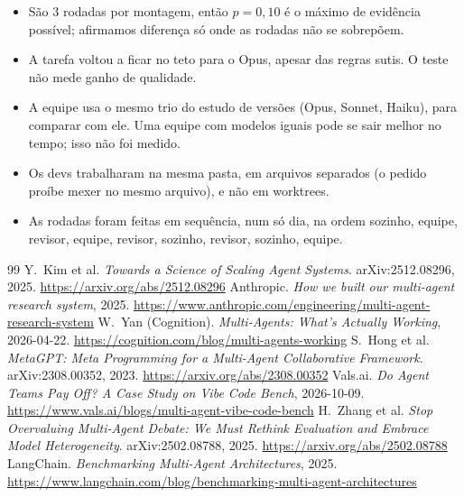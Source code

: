 \documentclass[11pt,a4paper]{article}
\begin{document}
\begin{itemize}
  \item São 3 rodadas por montagem, então $p = 0{,}10$ é o máximo de evidência possível; afirmamos
    diferença só onde as rodadas não se sobrepõem.
  \item A tarefa voltou a ficar no teto para o Opus, apesar das regras sutis. O teste não mede ganho de
    qualidade.
  \item A equipe usa o mesmo trio do estudo de versões (Opus, Sonnet, Haiku), para comparar com ele. Uma
    equipe com modelos iguais pode se sair melhor no tempo; isso não foi medido.
  \item Os devs trabalharam na mesma pasta, em arquivos separados (o pedido proíbe mexer no mesmo arquivo),
    e não em worktrees.
  \item As rodadas foram feitas em sequência, num só dia, na ordem sozinho, equipe, revisor, equipe,
    revisor, sozinho, revisor, sozinho, equipe.
\end{itemize}


\begin{thebibliography}{99}\small
{} Y.~Kim et al. \emph{Towards a Science of Scaling Agent Systems}. arXiv:2512.08296, 2025.
  \url{https://arxiv.org/abs/2512.08296}
 Anthropic. \emph{How we built our multi-agent research system}, 2025.
  \url{https://www.anthropic.com/engineering/multi-agent-research-system}
 W.~Yan (Cognition). \emph{Multi-Agents: What's Actually Working}, 2026-04-22.
  \url{https://cognition.com/blog/multi-agents-working}
 S.~Hong et al. \emph{MetaGPT: Meta Programming for a Multi-Agent Collaborative
  Framework}. arXiv:2308.00352, 2023. \url{https://arxiv.org/abs/2308.00352}
 Vals.ai. \emph{Do Agent Teams Pay Off? A Case Study on Vibe Code Bench}, 2026-10-09.
  \url{https://www.vals.ai/blogs/multi-agent-vibe-code-bench}
 H.~Zhang et al. \emph{Stop Overvaluing Multi-Agent Debate: We Must Rethink Evaluation and
  Embrace Model Heterogeneity}. arXiv:2502.08788, 2025. \url{https://arxiv.org/abs/2502.08788}
 LangChain. \emph{Benchmarking Multi-Agent Architectures}, 2025.
  \url{https://www.langchain.com/blog/benchmarking-multi-agent-architectures}
\end{thebibliography}
\end{document}

